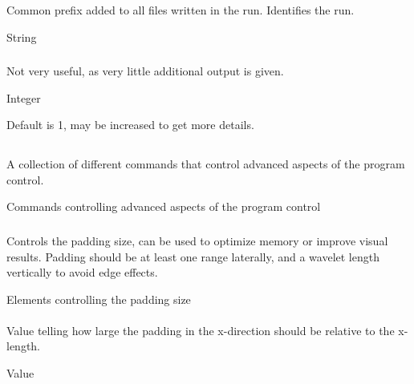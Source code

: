 \subsubsection{}
 \slist
   \item \Description Common prefix added to all files written in the run. Identifies the run.
   \item \Argument String
   \item \Default
 \elist

\subsubsection{}
 \slist
   \item \Description Not very useful, as very little additional output is given.
   \item \Argument Integer
   \item \Default Default is 1, may be increased to get more details.
 \elist

\subsection{} 
 \slist
   \item \Description A collection of different commands that control advanced aspects of the program control.
   \item \Argument Commands controlling advanced aspects of the program control
   \item \Default
 \elist

\subsubsection{}
 \slist
   \item \Description Controls the padding size, can be used to optimize memory or improve visual results. Padding should be at least one range laterally, and a wavelet length vertically to avoid edge effects.
   \item \Argument Elements controlling the padding size
   \item \Default
 \elist

\paragraph{}
 \slist
   \item \Description Value telling how large the padding in the x-direction should be relative to the x-length. %
   \item \Argument Value
   \item {}
 \elist

